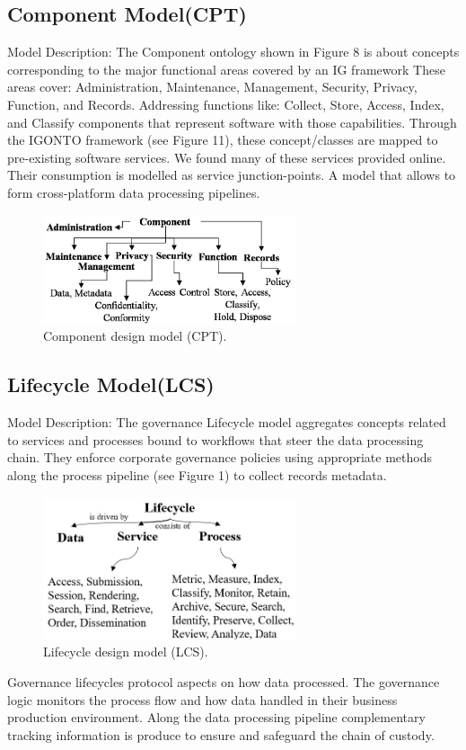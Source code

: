 \subsection{Component Model(CPT)}
Model Description: The Component ontology shown in Figure 8 is about concepts corresponding to the major functional areas covered by an IG framework These areas cover: Administration, Maintenance, Management, Security, Privacy, Function, and Records. Addressing functions like: Collect, Store, Access, Index, and Classify components that represent software with those capabilities. Through the IGONTO framework (see Figure 11), these concept/classes are mapped to pre-existing software services. We found many of these services provided online. 
Their consumption is modelled as service junction-points. A model that allows to form cross-platform data processing pipelines.
%
\begin{figure}[h]
  \centering
    \includegraphics[width=7.5cm]{images/Fig8-IG.CPT.Model.png}
    \caption{Component design model (CPT).}
  \label{fig:cptmod}
\end{figure}
%
\subsection{Lifecycle Model(LCS)}
 Model Description: The governance Lifecycle model aggregates concepts related to services and processes bound to workflows that steer the data processing chain. They enforce corporate governance policies using appropriate methods along the process pipeline (see Figure 1) to collect records metadata.
%
%
\begin{figure}[h]
  \centering
    \includegraphics[width=7.5cm]{images/Fig9-IG.LCS.Model.png}
    \caption{Lifecycle design model (LCS).}
  \label{fig:lcsmod}
\end{figure}
Governance lifecycles protocol aspects on how data processed. The governance logic monitors the process flow and how data handled in their business production environment. Along the data processing pipeline complementary tracking information is produce to ensure and safeguard the chain of custody.
%

